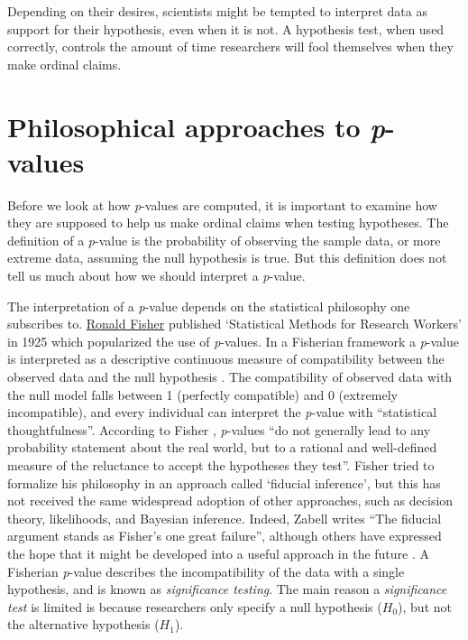 \documentclass[
  oneside]{book}
\begin{document}
Depending on their desires, scientists might be tempted to interpret data as support for their hypothesis, even when it is not. A hypothesis test, when used correctly, controls the amount of time researchers will fool themselves when they make ordinal claims.

\hypertarget{philosophical-approaches-to-p-values}{%
\section{\texorpdfstring{Philosophical approaches to \emph{p}-values}{Philosophical approaches to p-values}}\label{philosophical-approaches-to-p-values}}

Before we look at how \emph{p}-values are computed, it is important to examine how they are supposed to help us make ordinal claims when testing hypotheses. The definition of a \emph{p}-value is the probability of observing the sample data, or more extreme data, assuming the null hypothesis is true. But this definition does not tell us much about how we should interpret a \emph{p}-value.

The interpretation of a \emph{p}-value depends on the statistical philosophy one subscribes to. \href{https://en.wikipedia.org/wiki/Ronald_Fisher}{Ronald Fisher} published `Statistical Methods for Research Workers' in 1925 which popularized the use of \emph{p}-values. In a Fisherian framework a \emph{p}-value is interpreted as a descriptive continuous measure of compatibility between the observed data and the null hypothesis \citep{greenland_statistical_2016}. The compatibility of observed data with the null model falls between 1 (perfectly compatible) and 0 (extremely incompatible), and every individual can interpret the \emph{p}-value with ``statistical thoughtfulness''. According to Fisher \citeyearpar{fisher_statistical_1956}, \emph{p}-values ``do not generally lead to any probability statement about the real world, but to a rational and well-defined measure of the reluctance to accept the hypotheses they test''. Fisher tried to formalize his philosophy in an approach called `fiducial inference', but this has not received the same widespread adoption of other approaches, such as decision theory, likelihoods, and Bayesian inference. Indeed, Zabell \citeyearpar{zabell_r_1992} writes ``The fiducial argument stands as Fisher's one great failure'', although others have expressed the hope that it might be developed into a useful approach in the future \citep{schweder_confidence_2016}. A Fisherian \emph{p}-value describes the incompatibility of the data with a single hypothesis, and is known as \emph{significance testing}. The main reason a \emph{significance test} is limited is because researchers only specify a null hypothesis (\(H_0\)), but not the alternative hypothesis (\(H_1\)).
\end{document}
